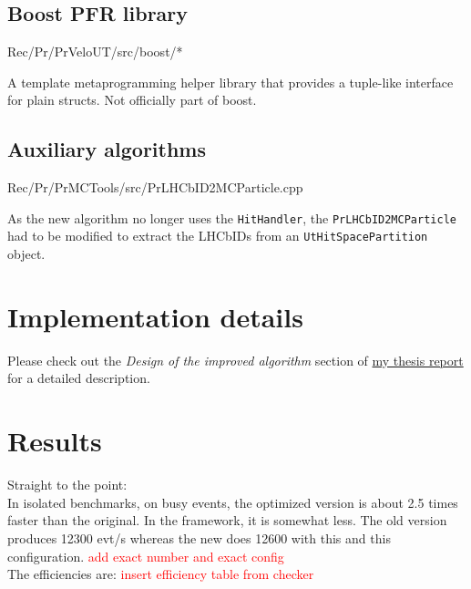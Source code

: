 \documentclass[12pt]{article}
\newcommand\tab[1][.7cm]{\hspace*{#1}}
\newcommand{\code}[1]{\texttt{#1}}
\begin{document}
\subsection{Boost PFR library}

\begin{itshape}
    Rec/Pr/PrVeloUT/src/boost/*
\end{itshape}

\vspace{1pc}

A template metaprogramming helper library that provides a tuple-like interface for plain structs. Not officially part of boost.


\subsection{Auxiliary algorithms}

\begin{itshape}
    \tab Rec/Pr/PrMCTools/src/PrLHCbID2MCParticle.cpp
\end{itshape}

\vspace{1pc}

As the new algorithm no longer uses the \code{HitHandler}, the \code{PrLHCbID2MCParticle} had to be modified to extract the LHCbIDs from an \code{UtHitSpacePartition} object.



\section{Implementation details}

Please check out the \textit{Design of the improved algorithm} section of \href{https://github.com/petiaccja/UU_CERN_Thesis/blob/master/Report/uu_cern_thesis_report.pdf}{my thesis report} for a detailed description.



\section{Results}

Straight to the point:\\
In isolated benchmarks, on busy events, the optimized version is about 2.5 times faster than the original. In the framework, it is somewhat less. The old version produces 12300 evt/s whereas the new does 12600 with this and this configuration. \textcolor{red}{add exact number and exact config}\\
The efficiencies are:
\textcolor{red}{insert efficiency table from checker}
\end{document}

